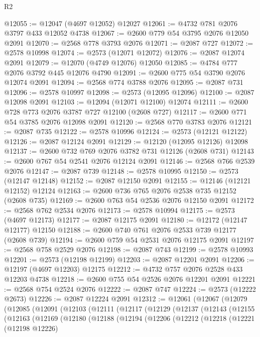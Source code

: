 \begin{lexlean}{R2}
\begin{coremodule}
@12055 := @12047 (@4697 @12052) @12027
@12061 := @4732 @781 @2076 @3797 @433 @12052 @4738
@12067 := @2600 @779 @54 @3795 @2076 @12050 @2091
@12070 := @2568 @778 @3793 @2076
@12071 := @2087 @727
@12072 := @2578 @10998
@12074 := @2573 (@12071 @12072)
@12076 := @2087 @12074 @2091
@12079 := @12070 (@4749 @12076) @12050
@12085 := @4784 @777 @2076 @3792 @445 @12076 @4790
@12091 := @2600 @775 @54 @3790 @2076 @12074 @2091
@12094 := @2568 @774 @3788 @2076
@12095 := @2087 @731
@12096 := @2578 @10997
@12098 := @2573 (@12095 @12096)
@12100 := @2087 @12098 @2091
@12103 := @12094 (@12071 @12100) @12074
@12111 := @2600 @728 @773 @2076 @3787 @727 @12100 (@2608 @727)
@12117 := @2600 @771 @54 @3785 @2076 @12098 @2091
@12120 := @2568 @770 @3783 @2076
@12121 := @2087 @735
@12122 := @2578 @10996
@12124 := @2573 (@12121 @12122)
@12126 := @2087 @12124 @2091
@12129 := @12120 (@12095 @12126) @12098
@12137 := @2600 @732 @769 @2076 @3782 @731 @12126 (@2608 @731)
@12143 := @2600 @767 @54 @2541 @2076 @12124 @2091
@12146 := @2568 @766 @2539 @2076
@12147 := @2087 @739
@12148 := @2578 @10995
@12150 := @2573 (@12147 @12148)
@12152 := @2087 @12150 @2091
@12155 := @12146 (@12121 @12152) @12124
@12163 := @2600 @736 @765 @2076 @2538 @735 @12152 (@2608 @735)
@12169 := @2600 @763 @54 @2536 @2076 @12150 @2091
@12172 := @2568 @762 @2534 @2076
@12173 := @2578 @10994
@12175 := @2573 (@4697 @12173)
@12177 := @2087 @12175 @2091
@12180 := @12172 (@12147 @12177) @12150
@12188 := @2600 @740 @761 @2076 @2533 @739 @12177 (@2608 @739)
@12194 := @2600 @759 @54 @2531 @2076 @12175 @2091
@12197 := @2568 @758 @2529 @2076
@12198 := @2087 @743
@12199 := @2578 @10993
@12201 := @2573 (@12198 @12199)
@12203 := @2087 @12201 @2091
@12206 := @12197 (@4697 @12203) @12175
@12212 := @4732 @757 @2076 @2528 @433 @12203 @4738
@12218 := @2600 @755 @54 @2526 @2076 @12201 @2091
@12221 := @2568 @754 @2524 @2076
@12222 := @2087 @747
@12224 := @2573 (@12222 @2673)
@12226 := @2087 @12224 @2091
@12312 := @12061
    (@12067
      (@12079
        (@12085
          (@12091
            (@12103
              (@12111
                (@12117
                  (@12129
                    (@12137
                      (@12143
                        (@12155
                          (@12163
                            (@12169
                              (@12180
                                (@12188
                                  (@12194
                                    (@12206
                                      (@12212
                                        (@12218
                                          (@12221
                                            (@12198 @12226)

\end{coremodule}
\end{lexlean}
